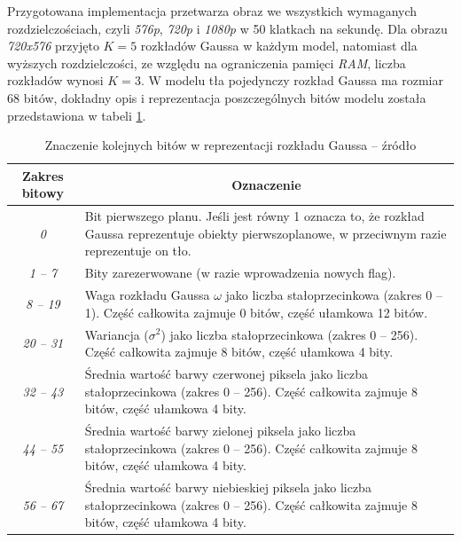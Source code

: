 Przygotowana implementacja przetwarza obraz we wszystkich wymaganych rozdzielczościach, czyli \textit{576p}, \textit{720p} i \textit{1080p} w 50 klatkach na sekundę. Dla obrazu \textit{720x576} przyjęto $K=5$ rozkładów Gaussa w każdym model, natomiast dla wyższych rozdzielczości, ze względu na ograniczenia pamięci \textit{RAM}, liczba rozkładów wynosi $K=3$. W modelu tła pojedynczy rozkład Gaussa ma rozmiar $68$ bitów, dokładny opis i reprezentacja poszczególnych bitów modelu została przedstawiona w tabeli \ref{tab:gmm_ram_model}.

\begin{table}[h]
	\centering
	\begin{threeparttable}
		\caption{Znaczenie kolejnych bitów w reprezentacji rozkładu Gaussa -- źródło \cite{piszczek_15}}
		\label{tab:gmm_ram_model}

		\begin{tabular}{| c | m{12.5cm} |}  
		\hline
		\textbf{Zakres bitowy} & \multicolumn{1}{c|}{\textbf{Oznaczenie}} \\
		\hline
		\textit{0} & Bit pierwszego planu. Jeśli jest równy 1 oznacza to, że rozkład Gaussa reprezentuje obiekty pierwszoplanowe, w przeciwnym razie reprezentuje on tło. \\
		\hline
		\textit{1 -- 7} & Bity zarezerwowane (w razie wprowadzenia nowych flag). \\
		\hline
        \textit{8 -- 19} & Waga rozkładu Gaussa $\omega$ jako liczba stałoprzecinkowa (zakres 0 -- 1). Część całkowita zajmuje 0 bitów, część ułamkowa 12 bitów. \\
	    \hline
	    \textit{20 -- 31} & Wariancja ($\sigma^2$) jako liczba stałoprzecinkowa (zakres 0 -- 256). Część całkowita zajmuje 8 bitów, część ułamkowa 4 bity. \\
	    \hline
	    \textit{32 -- 43} & Średnia wartość barwy czerwonej piksela jako liczba stałoprzecinkowa (zakres 0 -- 256). Część całkowita zajmuje 8 bitów, część ułamkowa 4 bity. \\
        \hline
        \textit{44 -- 55} & Średnia wartość barwy zielonej piksela jako liczba stałoprzecinkowa (zakres 0 -- 256). Część całkowita zajmuje 8 bitów, część ułamkowa 4 bity. \\
        \hline
        \textit{56 -- 67} & Średnia wartość barwy niebieskiej piksela jako liczba stałoprzecinkowa (zakres 0 -- 256). Część całkowita zajmuje 8 bitów, część ułamkowa 4 bity. \\
        \hline
		\end{tabular}				
	\end{threeparttable}
\end{table}

